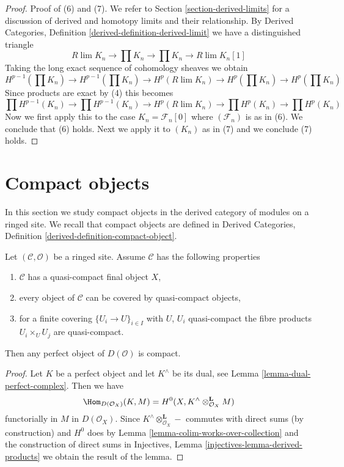 \begin{proof}
\medskip\noindent
Proof of (6) and (7). We refer to Section \ref{section-derived-limits}
for a discussion of derived and homotopy limits and their relationship.
By Derived Categories, Definition \ref{derived-definition-derived-limit}
we have a distinguished
triangle
$$
R\lim K_n \to \prod K_n \to \prod K_n \to R\lim K_n[1]
$$
Taking the long exact sequence of cohomology sheaves we obtain
$$
H^{p - 1}(\prod K_n) \to H^{p - 1}(\prod K_n) \to
H^p(R\lim K_n) \to H^p(\prod K_n) \to H^p(\prod K_n)
$$
Since products are exact by (4) this becomes
$$
\prod H^{p - 1}(K_n) \to \prod H^{p - 1}(K_n) \to
H^p(R\lim K_n) \to \prod H^p(K_n) \to \prod H^p(K_n)
$$
Now we first apply this to the case $K_n = \mathcal{F}_n[0]$
where $(\mathcal{F}_n)$ is as in (6). We conclude that (6) holds.
Next we apply it to $(K_n)$ as in (7) and we conclude (7) holds.
\end{proof}






\section{Compact objects}
\label{section-compact}

\noindent
In this section we study compact objects in the derived category of modules
on a ringed site. We recall that compact objects are defined in
Derived Categories, Definition \ref{derived-definition-compact-object}.

\begin{lemma}
\label{lemma-perfect-is-compact}
Let $(\mathcal{C}, \mathcal{O})$ be a ringed site. Assume
$\mathcal{C}$ has the following properties
\begin{enumerate}
\item $\mathcal{C}$ has a quasi-compact final object $X$,
\item every object of $\mathcal{C}$ can be covered by quasi-compact objects,
\item for a finite covering $\{U_i \to U\}_{i \in I}$
with $U$, $U_i$ quasi-compact the fibre products $U_i \times_U U_j$ are
quasi-compact.
\end{enumerate}
Then any perfect object of $D(\mathcal{O})$ is compact.
\end{lemma}

\begin{proof}
Let $K$ be a perfect object and let $K^\wedge$ be its dual, see
Lemma \ref{lemma-dual-perfect-complex}. Then we have
$$
\Hom_{D(\mathcal{O}_X)}(K, M) =
H^0(X, K^\wedge \otimes_{\mathcal{O}_X}^\mathbf{L} M)
$$
functorially in $M$ in $D(\mathcal{O}_X)$. Since
$K^\wedge \otimes_{\mathcal{O}_X}^\mathbf{L} -$ commutes with
direct sums (by construction) and $H^0$ does by
Lemma \ref{lemma-colim-works-over-collection}
and the construction of direct sums in
Injectives, Lemma \ref{injectives-lemma-derived-products}
we obtain the result of the lemma.
\end{proof}

